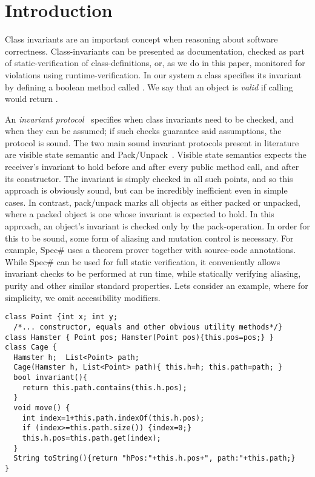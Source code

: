 \section{Introduction}

Class invariants are an important concept when reasoning about software correctness.
Class-invariants can be presented as documentation, checked as part of static-verification of class-definitions, or, as we do in this paper, monitored for violations using runtime-verification.
In our system a class specifies its invariant by defining a boolean method called \Q@invariant@. We say that an object is \emph{valid} if calling \Q@invariant@ would return \Q@true@.

An \emph{invariant protocol}~\cite{?} specifies when class invariants need to be checked, and when they can be assumed; if such checks guarantee said assumptions, the protocol is sound.
The two main sound invariant protocols present in literature are visible state semantic \cite{??} and Pack/Unpack~\cite{?}. Visible state semantics expects the receiver's invariant to hold before and after every public method call, and after its constructor. The invariant is simply checked in all such points, and so this approach is obviously sound, but can be incredibly inefficient even in simple cases.
In contrast, pack/unpack marks all objects as either packed or unpacked, where a packed object is one whose invariant is expected to hold.
In this approach, an object's invariant is checked only by the pack-operation.
In order for this to be sound, some form of aliasing and mutation control is necessary. For example, Spec\# uses a theorem prover together with source-code annotations.
While Spec\# can be used for full static verification, it conveniently allows invariant checks to be performed
at run time, while statically verifying aliasing, purity and other similar standard properties.
Lets consider an example, where for simplicity, we omit accessibility modifiers.
\begin{lstlisting}
class Point {int x; int y;
  /*... constructor, equals and other obvious utility methods*/}
class Hamster { Point pos; Hamster(Point pos){this.pos=pos;} }
class Cage {
  Hamster h;  List<Point> path;
  Cage(Hamster h, List<Point> path){ this.h=h; this.path=path; }
  bool invariant(){
    return this.path.contains(this.h.pos);
  }
  void move() {
    int index=1+this.path.indexOf(this.h.pos);
    if (index>=this.path.size()) {index=0;}
    this.h.pos=this.path.get(index);
  }
  String toString(){return "hPos:"+this.h.pos+", path:"+this.path;}
}
\end{lstlisting}
